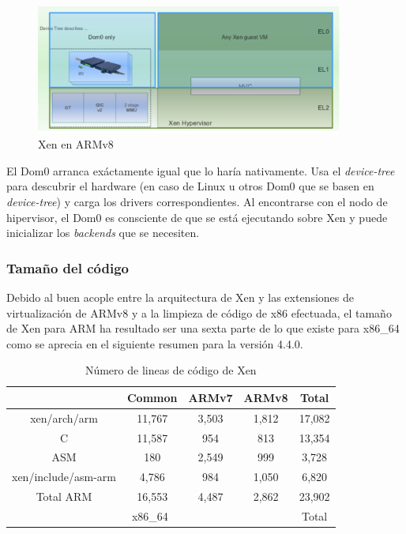 \begin{figure}[!h]
  \centering
  \includegraphics[width=0.90\textwidth]{recursos/xen_3.png}
  \caption{Xen en ARMv8}
  \label{fig:xen_3}
\end{figure}

El Dom0 arranca exáctamente igual que lo haría nativamente. Usa el \textit{device-tree} para descubrir el hardware (en caso de Linux u otros Dom0 que se basen en \textit{device-tree}) y carga los drivers correspondientes. Al encontrarse con el nodo de hipervisor, el Dom0 es consciente de que se está ejecutando sobre Xen y puede inicializar los \textit{backends} que se necesiten.

\subsubsection{Tamaño del código}

Debido al buen acople entre la arquitectura de Xen y las extensiones de virtualización de ARMv8 y a la limpieza de código de x86 efectuada, el tamaño de Xen para ARM ha resultado ser una sexta parte de lo que existe para x86\_64 como se aprecia en el siguiente resumen para la versión 4.4.0.

\begin{table}[htb]

	\label{table:results45}
  \centering

	\begin{tabular}{ |c|c|c|c|c| }
		\hline
     & Common & ARMv7 & ARMv8 & Total\\
    \hline
    xen/arch/arm          & 11,767      & 3,503  & 1,812   & 17,082 \\
    C                     & 11,587      & 954    & 813	    & 13,354 \\
    ASM                   & 180         & 2,549  & 999     & 3,728  \\
    xen/include/asm-arm   & 4,786       & 984    & 1,050   & 6,820  \\
    Total ARM	            & 16,553  & 4,487  & 2,862        & 23,902 \\
    \multicolumn{4}{|c|}{x86\_64}                           & Total\\
	\end{tabular}
	\caption{Número de lineas de código de Xen}

\end{table}

